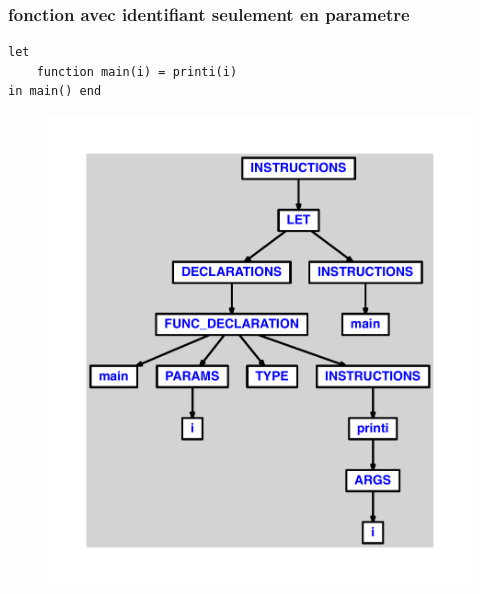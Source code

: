 \documentclass{article}
\begin{document}
\subsubsection{fonction avec identifiant seulement en parametre}
\begin{lstlisting}
let
	function main(i) = printi(i)
in main() end
\end{lstlisting}
\newpage
\begin{figure}[H]
\centering
\includegraphics[max width=\textwidth]{ast/ast_227.pdf}
\end{figure}
\newpage
\end{document}

